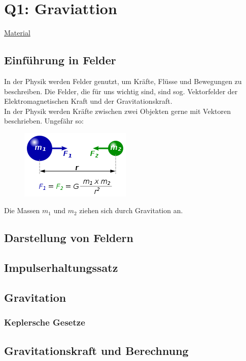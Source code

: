 \documentclass{article}
\begin{document}
    \section{Q1: Graviattion}

        \href{https://gcm.schule/material/2023/physik/lk12/index_Q1.md}{Material}

        \subsection{Einführung in Felder}
            In der Physik werden Felder genutzt, um Kräfte, Flüsse und Bewegungen zu beschreiben.
            Die Felder, die für uns wichtig sind, sind sog. Vektorfelder der Elektromagnetischen Kraft
            und der Gravitationskraft. \\
            In der Physik werden Kräfte zwischen zwei Objekten gerne mit Vektoren beschrieben. Ungefähr so:
            \begin{figure}[h] \label{figure3: Gravitationskraft} \includegraphics{graphics/universalGravitation.png}\end{figure}   
            Die Massen $m_1$ und $ m_2 $ ziehen sich durch Gravitation an.
        \subsection{Darstellung von Feldern}


        \subsection{Impulserhaltungssatz}
        
        \subsection{Gravitation}
        
            \subsubsection{Keplersche Gesetze}
        
        	\subsection{Gravitationskraft und Berechnung}
        
\end{document}
